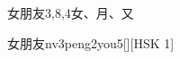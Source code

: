 \begin{entry}{女朋友}{3,8,4}{⼥、⽉、⼜}
  \begin{phonetics}{女朋友}{nv3peng2you5}[][HSK 1]
  \end{phonetics}
\end{entry}
